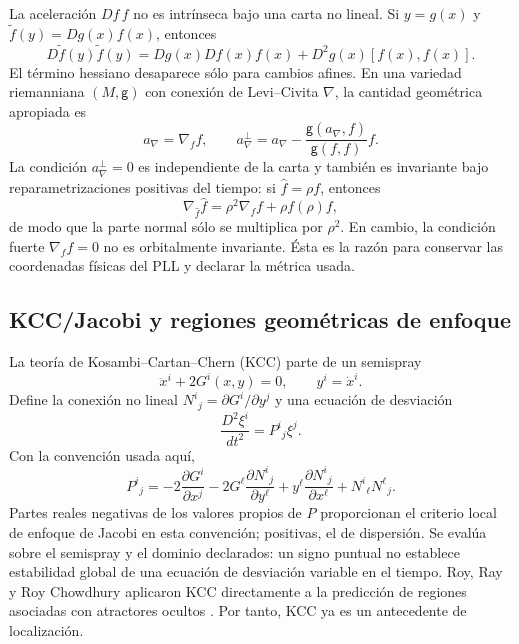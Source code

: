 La aceleración $Df\,f$ no es intrínseca bajo una carta no lineal. Si
$y=g(x)$ y $\widetilde f(y)=Dg(x)f(x)$, entonces
\begin{equation}
 D\widetilde f(y)\widetilde f(y)
 =Dg(x)Df(x)f(x)+D^2g(x)[f(x),f(x)].
 \label{gt:eq:nonlinear-coordinate-acceleration}
\end{equation}
El término hessiano desaparece sólo para cambios afines. En una variedad
riemanniana $(M,\mathsf g)$ con conexión de Levi--Civita $\nabla$, la cantidad
geométrica apropiada es
\begin{equation}
 a_\nabla=\nabla_f f,
 \qquad
 a_\nabla^\perp
 =a_\nabla-\frac{\mathsf g(a_\nabla,f)}{\mathsf g(f,f)}f.
 \label{gt:eq:covariant-normal-acceleration}
\end{equation}
La condición $a_\nabla^\perp=0$ es independiente de la carta y también es
invariante bajo reparametrizaciones positivas del tiempo: si
$\widehat f=\rho f$, entonces
\begin{equation}
 \nabla_{\widehat f}\widehat f
 =\rho^2\nabla_f f+\rho f(\rho)f,
 \label{gt:eq:time-rescaling-covariant}
\end{equation}
de modo que la parte normal sólo se multiplica por $\rho^2$. En cambio, la
condición fuerte $\nabla_f f=0$ no es orbitalmente invariante. Ésta es la razón
para conservar las coordenadas físicas del PLL y declarar la métrica usada.

\subsection{KCC/Jacobi y regiones geométricas de enfoque}
\label{subsec:gt-kcc}

La teoría de Kosambi--Cartan--Chern (KCC) parte de un semispray
\begin{equation}
 \ddot x^i+2G^i(x,y)=0,
 \qquad y^i=\dot x^i.
 \label{gt:eq:kcc-semispray}
\end{equation}
Define la conexión no lineal
$N^i{}_j=\partial G^i/\partial y^j$ y una ecuación de desviación
\begin{equation}
 \frac{D^2\xi^i}{dt^2}=P^i{}_j\xi^j.
 \label{gt:eq:kcc-deviation}
\end{equation}
Con la convención usada aquí,
\begin{equation}
 P^i{}_j=-2\frac{\partial G^i}{\partial x^j}
 -2G^\ell\frac{\partial N^i{}_j}{\partial y^\ell}
 +y^\ell\frac{\partial N^i{}_j}{\partial x^\ell}
 +N^i{}_\ell N^\ell{}_j.
 \label{gt:eq:kcc-P}
\end{equation}
Partes reales negativas de los valores propios de $P$ proporcionan el criterio
local de enfoque de Jacobi en esta convención; positivas, el de dispersión.
Se evalúa sobre el semispray y el dominio declarados: un signo puntual no
establece estabilidad global de una ecuación de desviación variable en el
tiempo. Roy, Ray y Roy
Chowdhury aplicaron KCC directamente a la predicción de regiones asociadas con
atractores ocultos \cite{RoyRayChowdhury2024KCC}. Por tanto, KCC ya es un
antecedente de localización.

